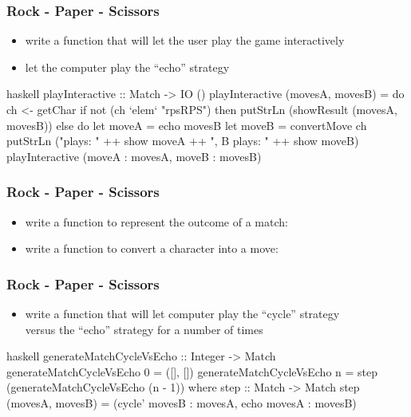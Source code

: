 \documentclass[dvipsnames]{beamer}
\theoremstyle{plain}
\begin{document}
\begin{frame}[fragile]
  \frametitle{Rock - Paper - Scissors}

  \begin{itemize}
    \item write a function that will let the user play the game interactively
    \item let the computer play the ``echo'' strategy
  \end{itemize}

  \pause
  \begin{exampleblock}{}
    \begin{pygments}{haskell}
playInteractive :: Match -> IO ()
playInteractive (movesA, movesB) = do
    ch <- getChar
    if not (ch `elem` "rpsRPS")
        then putStrLn (showResult (movesA, movesB))
        else do
            let moveA = echo movesB
            let moveB = convertMove ch
            putStrLn ("\nA plays: " ++ show moveA ++
                      ", B plays: " ++ show moveB)
            playInteractive (moveA : movesA,
                             moveB : movesB)
    \end{pygments}
  \end{exampleblock}
\end{frame}

\begin{frame}
  \frametitle{Rock - Paper - Scissors}

  \begin{itemize}
    \item write a function to represent the outcome of a match:\\
      \smallskip
    \item write a function to convert a character into a move:\\
      \smallskip
  \end{itemize}
\end{frame}

\begin{frame}[fragile]
  \frametitle{Rock - Paper - Scissors}

  \begin{itemize}
    \item write a function that will let computer play the ``cycle'' strategy\\
      versus the ``echo'' strategy for a number of times
  \end{itemize}

  \pause
  \begin{exampleblock}{}
    \begin{pygments}{haskell}
generateMatchCycleVsEcho :: Integer -> Match
generateMatchCycleVsEcho 0 = ([], [])
generateMatchCycleVsEcho n =
    step (generateMatchCycleVsEcho (n - 1))
      where
        step :: Match -> Match
        step (movesA, movesB) =
            (cycle' movesB : movesA,
             echo movesA : movesB)
    \end{pygments}
  \end{exampleblock}
\end{frame}
\end{document}
